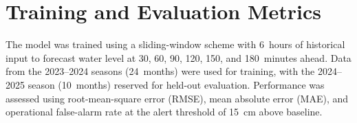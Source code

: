 \section{Training and Evaluation Metrics}
The model was trained using a sliding-window scheme with 6~hours of historical input to forecast water level at 30, 60, 90, 120, 150, and 180~minutes ahead. Data from the 2023--2024 seasons (24~months) were used for training, with the 2024--2025 season (10~months) reserved for held-out evaluation. Performance was assessed using root-mean-square error (RMSE), mean absolute error (MAE), and operational false-alarm rate at the alert threshold of 15~cm above baseline.

